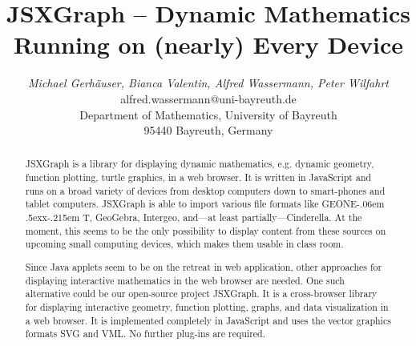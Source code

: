 \documentclass[12pt,a4paper]{article}%
\def\GEONExT{GEONE\kern-.06em \lower.5ex\hbox{x}\kern-.215em T}
\begin{document}
%
%
\title{JSXGraph -- Dynamic Mathematics Running on (nearly) Every Device}%
%
%
\author{\begin{tabular}{c}
\textit{Michael Gerh\"auser, Bianca Valentin, Alfred Wassermann, Peter Wilfahrt} \\
alfred.wassermann@uni-bayreuth.de\\
Department of Mathematics, 
University of Bayreuth\\
95440 Bayreuth, 
Germany\end{tabular}
}%
%
\date{}                                                   %
\maketitle                                                %
%
%
\begin{abstract}
%
JSXGraph is a library for displaying dynamic mathematics, e.g. dynamic geometry, 
function plotting, turtle graphics, in a web browser. 
It is written in JavaScript and runs on a broad variety of devices from 
desktop computers down to smart-phones and tablet computers. 
JSXGraph is able to import various file formats like \GEONExT{}, GeoGebra, Intergeo, 
and---at least partially---Cinderella. 
At the moment, this seems to be the only possibility to display content from 
these sources on upcoming small computing devices, which makes them usable 
in class room.

Since Java applets seem to be on the retreat in web application, other 
approaches for displaying interactive mathematics in the web browser are needed. 
One such alternative could be our open-source project JSXGraph. It is a 
cross-browser library for displaying interactive geometry, function plotting, 
graphs, and data visualization in a web browser. It is implemented completely 
in JavaScript and uses the vector graphics formats SVG and VML. No further 
plug-ins are required.
%
\end{abstract}%
%
\end{document}
